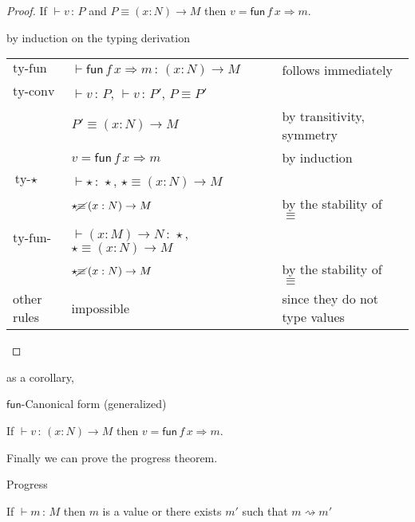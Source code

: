 \begin{proof}
If $\vdash v\,:\,P$ and $P\equiv\left(x:N\right)\rightarrow M$ then
$v=\mathsf{fun}\,f\,x\Rightarrow m$.

by induction on the typing derivation

\begin{tabular}{lll}
$\textrm{ty-fun}$ & $\vdash\mathsf{fun}\,f\,x\Rightarrow m\,:\,\left(x:N\right)\rightarrow M$ & follows immediately\tabularnewline
$\textrm{ty-conv}$ & $\vdash v\,:\,P$, $\vdash v\,:\,P'$, $P\equiv P'$ & \tabularnewline
 & $P'\equiv\left(x:N\right)\rightarrow M$ & by transitivity, symmetry\tabularnewline
 & $v=\mathsf{fun}\,f\,x\Rightarrow m$ & by induction\tabularnewline
$\textrm{ty-}\star$ & $\vdash\star\,:\,\star$, $\star\equiv\left(x:N\right)\rightarrow M$ & \tabularnewline
 & $\star\cancel{\equiv}\left(x:N\right)\rightarrow M$ & by the stability of $\equiv$\tabularnewline
$\textrm{ty-fun-ty}$ & $\vdash\left(x:M\right)\rightarrow N\,:\,\star$, $\star\equiv\left(x:N\right)\rightarrow M$ & \tabularnewline
 & $\star\cancel{\equiv}\left(x:N\right)\rightarrow M$ & by the stability of $\equiv$\tabularnewline
other rules & impossible & since they do not type values\tabularnewline
\end{tabular}
\end{proof}
as a corollary,
\begin{cor}
$\mathsf{fun}$-Canonical form (generalized)

If $\vdash v\,:\,\left(x:N\right)\rightarrow M$ then \textup{$v=\mathsf{fun}\,f\,x\Rightarrow m$.}
\end{cor}


Finally we can prove the progress theorem.
\begin{thm}
Progress 

If $\vdash m\,:\,M$ then $m$ is a value or there exists $m'$ such
that $m\rightsquigarrow m'$
\end{thm}

